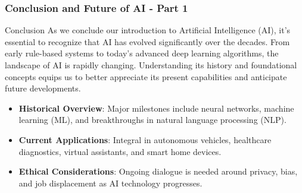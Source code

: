 \documentclass[aspectratio=169]{beamer}
\begin{document}
\begin{frame}[fragile]
    \frametitle{Conclusion and Future of AI - Part 1}
    \begin{block}{Conclusion}
        As we conclude our introduction to Artificial Intelligence (AI), it's essential to recognize that AI has evolved significantly over the decades. From early rule-based systems to today's advanced deep learning algorithms, the landscape of AI is rapidly changing. Understanding its history and foundational concepts equips us to better appreciate its present capabilities and anticipate future developments.
    \end{block}
    
    \begin{itemize}
        \item \textbf{Historical Overview}: Major milestones include neural networks, machine learning (ML), and breakthroughs in natural language processing (NLP).
        \item \textbf{Current Applications}: Integral in autonomous vehicles, healthcare diagnostics, virtual assistants, and smart home devices.
        \item \textbf{Ethical Considerations}: Ongoing dialogue is needed around privacy, bias, and job displacement as AI technology progresses.
    \end{itemize}
\end{frame}
\end{document}
